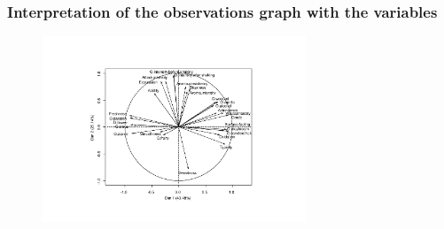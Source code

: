 \documentclass[9pt]{beamer}
\newcommand{\red}[1]{\textcolor{red}{#1}}
\begin{document}
\begin{frame}
\frametitle{Interpretation of the observations graph with the variables}
\vfill
\begin{figure}[H]
\includegraphics[width=0.7\textwidth]{./wine_PCA_var.pdf}
\end{figure}
\vfill
\end{frame}
%
%
%
%
%
\end{document}

